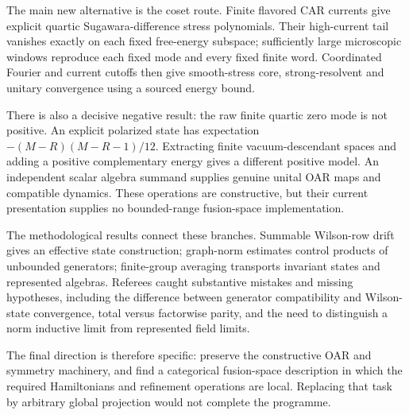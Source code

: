 The main new alternative is the coset route. Finite flavored CAR currents
give explicit quartic Sugawara-difference stress polynomials. Their high-current
tail vanishes exactly on each fixed free-energy subspace; sufficiently large
microscopic windows reproduce each fixed mode and every fixed finite word.
Coordinated Fourier and current cutoffs then give smooth-stress core,
strong-resolvent and unitary convergence using a sourced energy bound.

There is also a decisive negative result: the raw finite quartic zero mode
is not positive. An explicit polarized state has expectation
$-(M-R)(M-R-1)/12$. Extracting finite vacuum-descendant spaces and adding
a positive complementary energy gives a different positive model. An
independent scalar algebra summand supplies genuine unital OAR maps and
compatible dynamics. These operations are constructive, but their current
presentation supplies no bounded-range fusion-space implementation.

The methodological results connect these branches. Summable Wilson-row drift
gives an effective state construction; graph-norm estimates control products
of unbounded generators; finite-group averaging transports invariant states
and represented algebras. Referees caught substantive mistakes and missing
hypotheses, including the difference between generator compatibility and
Wilson-state convergence, total versus factorwise parity, and the need to
distinguish a norm inductive limit from represented field limits.

The final direction is therefore specific: preserve the constructive OAR and
symmetry machinery, and find a categorical fusion-space description in which
the required Hamiltonians and refinement operations are local. Replacing
that task by arbitrary global projection would not complete the programme.

\clearpage

